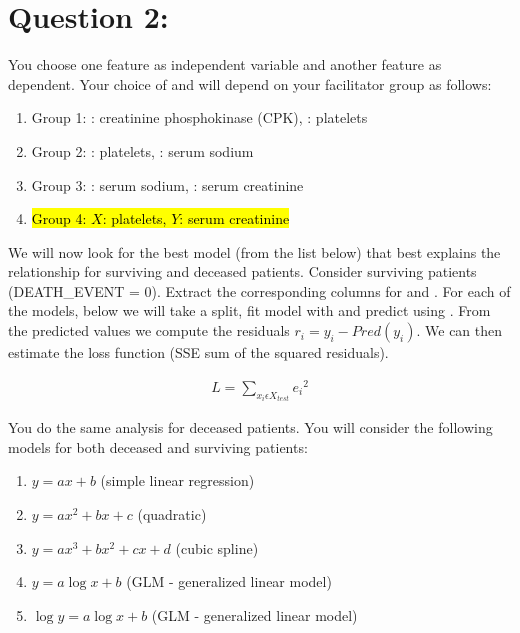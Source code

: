 \documentclass[../../assignment4.tex]{subfiles}
\begin{document}
    \section{Question 2: {}} \label{sec:question2}

    You choose one feature  as independent variable  and another feature  as dependent.
    Your choice of  and  will depend on your facilitator group as follows:

    \begin{enumerate}
        \item Group 1: : creatinine phosphokinase (CPK), : platelets
        \item Group 2: : platelets, : serum sodium
        \item Group 3: : serum sodium, : serum creatinine
        \item \hl{Group 4: $X$: platelets, $Y$: serum creatinine}
    \end{enumerate}

    We will now look for the best model (from the list below) that best explains the relationship for surviving and deceased patients.
    Consider surviving patients (DEATH\_EVENT = 0).
    Extract the corresponding columns for  and .
    For each of the models, below we will take a  split, fit model with  and predict  using .
    From the predicted values  we compute the residuals $r_{i}=y_{i}-Pred(y_{i})$.
    We can then estimate the loss function (SSE sum of the squared residuals).

    \begin{align*} \label{sse_eqn}
    L = \sum_{x_{i}\epsilon{X_{test}}}^{}{e_{i}}^{2}
    \end{align*}

    You do the same analysis for deceased patients.
    You will consider the following models for both deceased and surviving patients:

    \begin{enumerate}
        \item $y = ax + b$ (simple linear regression)
        \item $y = ax^{2} + bx + c$ (quadratic)
        \item $y = ax^{3} + bx^{2} + cx + d$ (cubic spline)
        \item $y = a\log{x} + b$ (GLM - generalized linear model)
        \item $\log{y} = a\log{x} + b$ (GLM - generalized linear model)
    \end{enumerate}
\end{document}
